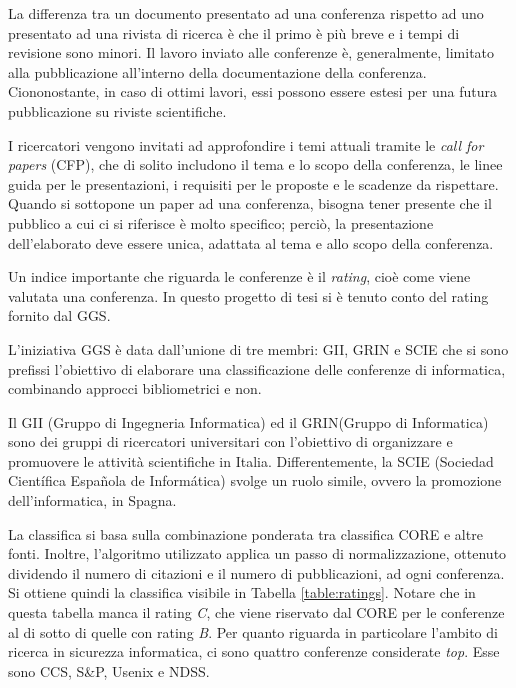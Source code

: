 
La differenza tra un documento presentato ad una conferenza rispetto ad uno
presentato ad una rivista di ricerca è che il primo è più breve e i tempi
di revisione sono minori. Il lavoro inviato alle conferenze è, generalmente,
limitato alla pubblicazione all’interno della documentazione della conferenza.
Ciononostante, in caso di ottimi lavori, essi possono essere estesi per una
futura pubblicazione su riviste scientifiche.

I ricercatori vengono invitati ad approfondire i temi attuali tramite le
\textit{call for papers} (CFP), che di solito includono il tema e lo scopo della
conferenza, le linee guida per le presentazioni, i requisiti per le proposte
e le scadenze da rispettare. Quando si sottopone un paper ad una conferenza,
bisogna tener presente che il pubblico a cui ci si riferisce è molto specifico;
perciò, la presentazione dell’elaborato deve essere unica, adattata al tema e
allo scopo della conferenza.


Un indice importante che riguarda le conferenze è il \textit{rating}, cioè
come viene valutata una conferenza. In questo progetto di tesi si è tenuto
conto del rating fornito dal GGS.

L'iniziativa GGS è data dall'unione di tre membri: GII, GRIN e SCIE che si sono prefissi l'obiettivo di elaborare una classificazione delle conferenze di informatica, combinando approcci bibliometrici e non.

Il GII (Gruppo di Ingegneria Informatica) \cite{gii} ed il GRIN(Gruppo di Informatica) \cite{grin} sono dei gruppi di ricercatori universitari con l'obiettivo di organizzare e promuovere le attività scientifiche in Italia. Differentemente, la SCIE (Sociedad Científica Española de Informática) svolge un ruolo simile, ovvero la promozione dell'informatica, in Spagna.

La classifica \cite{ggsRatingPdf} si basa sulla combinazione ponderata tra classifica CORE e altre fonti. Inoltre, l'algoritmo utilizzato applica un passo di normalizzazione, ottenuto dividendo il numero di citazioni e il numero di pubblicazioni, ad ogni conferenza.
Si ottiene quindi la classifica visibile in Tabella \ref{table:ratings}.
Notare che in questa tabella manca il rating \textit{C}, che viene riservato
dal CORE per le conferenze al di sotto di quelle con rating \textit{B}.
Per quanto riguarda in particolare l'ambito di ricerca in sicurezza informatica,
ci sono quattro conferenze considerate \textit{top}. Esse sono CCS, S\&P, Usenix
e NDSS.

